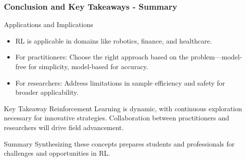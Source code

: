 \documentclass{beamer}
\begin{document}
\begin{frame}[fragile]
    \frametitle{Conclusion and Key Takeaways - Summary}
    \begin{block}{Applications and Implications}
        \begin{itemize}
            \item RL is applicable in domains like robotics, finance, and healthcare.
            \item For practitioners: Choose the right approach based on the problem—model-free for simplicity, model-based for accuracy.
            \item For researchers: Address limitations in sample efficiency and safety for broader applicability.
        \end{itemize}
    \end{block}
    
    \begin{block}{Key Takeaway}
        Reinforcement Learning is dynamic, with continuous exploration necessary for innovative strategies. 
        Collaboration between practitioners and researchers will drive field advancement.
    \end{block}
    
    \begin{block}{Summary}
        Synthesizing these concepts prepares students and professionals for challenges and opportunities in RL.
    \end{block}
\end{frame}
\end{document}

